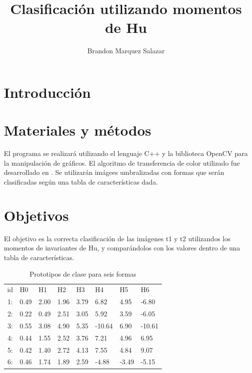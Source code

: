 \documentclass[10pt]{IEEEtran}
\title{Clasificación utilizando momentos de Hu}
\author{ Brandon Marquez Salazar }
\begin{document}
  \maketitle
  \section{Introducción}

  \section{Materiales y métodos}
  El programa se realizará utilizando el lenguaje C++ y la biblioteca OpenCV para la manipulación de gráficos.
  El algoritmo de transferencia de color utilizado fue desarrollado en \cite{Reinhard2001}.
  Se utilizarán imágees umbralizadas con formas que serán clasificadas según una tabla de características dada.

  \section{Objetivos}
  El objetivo es la correcta clasificación de las imágenes t1 y t2 utilizandos los momentos de invariantes de Hu,
  y comparándolos con los valores dentro de una tabla de características.
  
  \begin{table}[htpb]
    \centering
    \caption{Prototipos de clase para seis formas}
    \label{tab:prototipos}
  
    \begin{tabular}{ c l l l l l l l }
      id &    H0  &   H1   &   H2   &   H3   &   H4    &   H5   &   H6    \\
      1: &  0.49  &  2.00  &  1.96  & 3.79   & 6.82    &  4.95  & -6.80   \\
      2: &  0.22  &  0.49  &  2.51  &  3.05  &  5.92   &  3.59  & -6.05   \\
      3: &  0.55  &  3.08  &  4.90  &  5.35  & -10.64  &  6.90  & -10.61  \\
      4: &  0.44  &  1.55  &  2.52  &  3.76  &  7.21   &  4.96  &  6.95   \\
      5: &  0.42  &  1.40  &  2.72  &  4.13  &  7.55   &  4.84  &  9.07   \\ 
      6: &  0.46  &  1.74  &  1.89  &  2.59  & -4.88   & -3.49  & -5.15   \\
    \end{tabular}
  \end{table}
\end{document}
